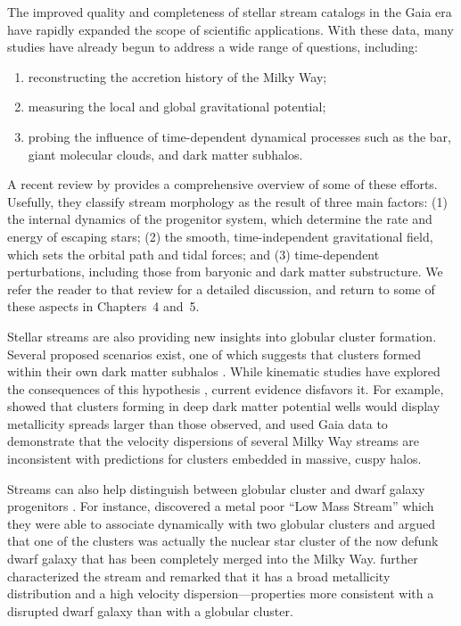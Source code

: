     The improved quality and completeness of stellar stream catalogs in the Gaia era have rapidly expanded the scope of scientific applications. With these data, many studies have already begun to address a wide range of questions, including:  
    \begin{enumerate}
        \item reconstructing the accretion history of the Milky Way;
        \item measuring the local and global gravitational potential;
        \item probing the influence of time-dependent dynamical processes such as the bar, giant molecular clouds, and dark matter subhalos.
    \end{enumerate}
    A recent review by \citet{2025NewAR.10001713B} provides a comprehensive overview of some of these efforts. Usefully, they classify stream morphology as the result of three main factors: (1) the internal dynamics of the progenitor system, which determine the rate and energy of escaping stars; (2) the smooth, time-independent gravitational field, which sets the orbital path and tidal forces; and (3) time-dependent perturbations, including those from baryonic and dark matter substructure. We refer the reader to that review for a detailed discussion, and return to some of these aspects in Chapters~4 and~5.

    Stellar streams are also providing new insights into globular cluster formation. Several proposed scenarios exist, one of which suggests that clusters formed within their own dark matter subhalos \citep{2025arXiv250116438K}. While kinematic studies have explored the consequences of this hypothesis \citep{2022A&A...667A.112V}, current evidence disfavors it. For example, \citet{2016ApJ...823...52K} showed that clusters forming in deep dark matter potential wells would display metallicity spreads larger than those observed, and \citet{2022ApJ...941L..38M} used Gaia data to demonstrate that the velocity dispersions of several Milky Way streams are inconsistent with predictions for clusters embedded in massive, cuspy halos.

    Streams can also help distinguish between globular cluster and dwarf galaxy progenitors \citep{2021ApJ...909L..26B}. For instance, \citet{2020ApJ...898L..37Y} discovered a metal poor ``Low Mass Stream''  which they were able to associate dynamically with two globular clusters and argued that one of the clusters was actually the nuclear star cluster of the now defunk dwarf galaxy that has been completely merged into the Milky Way. \citet{2021ApJ...920...51M} further characterized the stream and remarked that it has a broad metallicity distribution and a high velocity dispersion—properties more consistent with a disrupted dwarf galaxy than with a globular cluster. 
    
